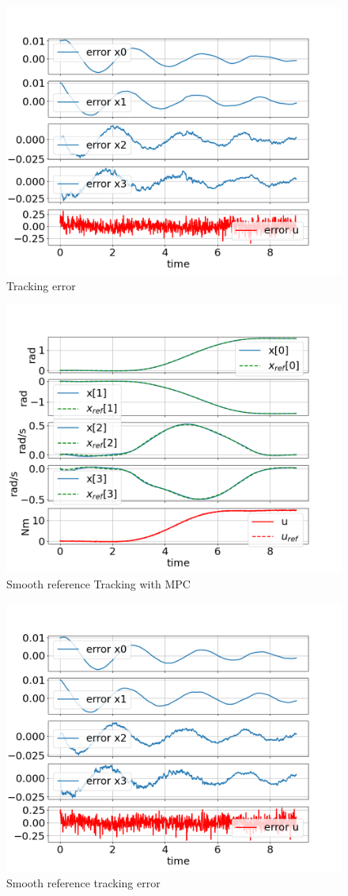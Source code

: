 \begin{figure}
    \centering
    \includegraphics[width=0.8\linewidth]{figs/downward_mpc_error.png}
    \caption{Tracking error}
    \label{fig:downward_mpc_error}
\end{figure}

\begin{figure}
    \centering
    \includegraphics[width=0.8\linewidth]{figs/downward_mpc_track_smooth.png}
    \caption{Smooth reference Tracking with MPC}
    \label{fig:downward_mpc_track_smooth}
\end{figure}

\begin{figure}
    \centering
    \includegraphics[width=0.8\linewidth]{figs/downward_mpc_error_smooth.png}
    \caption{Smooth reference tracking error}
    \label{fig:downward_mpc_error_smooth}
\end{figure}

